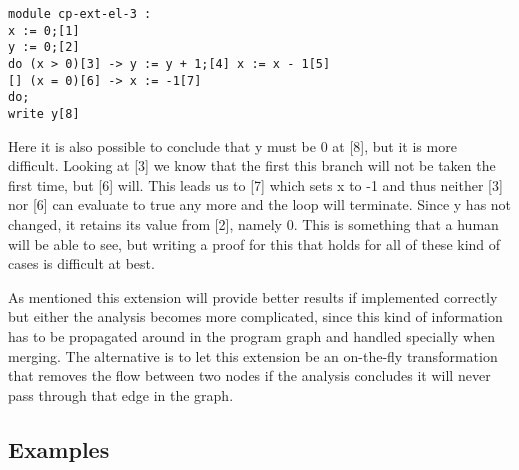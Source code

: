 \begin{lstlisting}
module cp-ext-el-3 :
x := 0;[1]
y := 0;[2]
do (x > 0)[3] -> y := y + 1;[4] x := x - 1[5]
[] (x = 0)[6] -> x := -1[7]
do;
write y[8]
\end{lstlisting}

\docpar
Here it is also possible to conclude that y must be 0 at [8], but it is more
difficult. Looking at [3] we know that the first this branch will not be
taken the first time, but [6] will. This leads us to [7] which sets x to -1
and thus neither [3] nor [6] can evaluate to true any more and the loop will
terminate. Since y has not changed, it retains its value from [2], namely 0.
  This is something that a human will be able to see, but writing a proof for
this that holds for all of these kind of cases is difficult at best.

\docpar
As mentioned this extension will provide better results if implemented correctly
but either the analysis becomes more complicated, since this kind of information
has to be propagated around in the program graph and handled specially when
merging.
  The alternative is to let this extension be an on-the-fly transformation that
removes the flow between two nodes if the analysis concludes it will never pass
through that edge in the graph.

\subsection{Examples}
